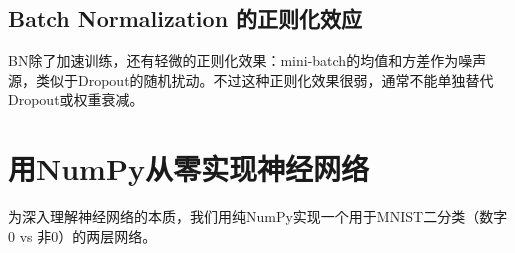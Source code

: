 \subsection{Batch Normalization 的正则化效应}

BN除了加速训练，还有轻微的正则化效果：mini-batch的均值和方差作为噪声源，类似于Dropout的随机扰动。不过这种正则化效果很弱，通常不能单独替代Dropout或权重衰减。

\section{用NumPy从零实现神经网络}

为深入理解神经网络的本质，我们用纯NumPy实现一个用于MNIST二分类（数字0 vs 非0）的两层网络。

